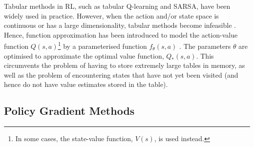 Tabular methods in RL, such as tabular Q-learning and SARSA, have been widely used in practice. However, when the action and/or state space is continuous or has a large dimensionality, tabular methods become infeasible \citep{sb}. Hence, function approximation has been introduced to model the action-value function $Q(s, a)$\footnote{In some cases, the state-value function, $V(s)$, is used instead.} by a parameterised function $f_{\theta}(s, a)$ \citep[e.g.,][]{long_function_approx}. The parameters $\theta$ are optimised to approximate the optimal value function, $Q_*(s, a)$. This circumvents the problem of having to store extremely large tables in memory, as well as the problem of encountering states that have not yet been visited (and hence do not have value estimates stored in the table).

\subsection*{Policy Gradient Methods}

